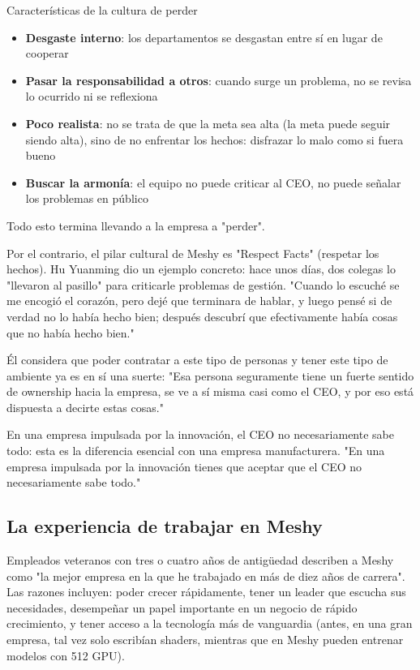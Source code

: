 \begin{warningbox}{Características de la cultura de perder}
\begin{itemize}
\item \textbf{Desgaste interno}: los departamentos se desgastan entre sí en lugar de cooperar
\item \textbf{Pasar la responsabilidad a otros}: cuando surge un problema, no se revisa lo ocurrido ni se reflexiona
\item \textbf{Poco realista}: no se trata de que la meta sea alta (la meta puede seguir siendo alta), sino de no enfrentar los hechos: disfrazar lo malo como si fuera bueno
\item \textbf{Buscar la armonía}: el equipo no puede criticar al CEO, no puede señalar los problemas en público
\end{itemize}
Todo esto termina llevando a la empresa a "perder".
\end{warningbox}

Por el contrario, el pilar cultural de Meshy es "Respect Facts" (respetar los hechos). Hu Yuanming dio un ejemplo concreto: hace unos días, dos colegas lo "llevaron al pasillo" para criticarle problemas de gestión. "Cuando lo escuché se me encogió el corazón, pero dejé que terminara de hablar, y luego pensé si de verdad no lo había hecho bien; después descubrí que efectivamente había cosas que no había hecho bien."

Él considera que poder contratar a este tipo de personas y tener este tipo de ambiente ya es en sí una suerte: "Esa persona seguramente tiene un fuerte sentido de ownership hacia la empresa, se ve a sí misma casi como el CEO, y por eso está dispuesta a decirte estas cosas."

En una empresa impulsada por la innovación, el CEO no necesariamente sabe todo: esta es la diferencia esencial con una empresa manufacturera. "En una empresa impulsada por la innovación tienes que aceptar que el CEO no necesariamente sabe todo."

\subsection{La experiencia de trabajar en Meshy}

Empleados veteranos con tres o cuatro años de antigüedad describen a Meshy como "la mejor empresa en la que he trabajado en más de diez años de carrera". Las razones incluyen: poder crecer rápidamente, tener un leader que escucha sus necesidades, desempeñar un papel importante en un negocio de rápido crecimiento, y tener acceso a la tecnología más de vanguardia (antes, en una gran empresa, tal vez solo escribían shaders, mientras que en Meshy pueden entrenar modelos con 512 GPU).

